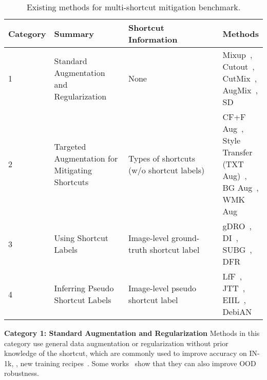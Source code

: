 \documentclass[10pt,twocolumn,letterpaper]{article}
\begin{document}
\begin{table}[b]
\vspace{-4mm}
\centering
\begin{adjustbox}{width=\linewidth}
\begin{tabular}{@{}p{0.15\linewidth}|p{0.3\linewidth}|p{0.4\linewidth}|p{0.475\linewidth}@{}}
\toprule
\textbf{Category} & \textbf{Summary}                                & \textbf{Shortcut Information} & \textbf{Methods}                                                   \\ \midrule
1        & Standard Augmentation and Regularization & None                    & Mixup~\cite{zhang2018Int.Conf.Learn.Represent.mixup}, Cutout~\cite{devries2017Improved,zhong2020AAAIConf.Artif.Intell.Random}, CutMix~\cite{yun2019IEEECVFInt.Conf.Comput.Vis.ICCVCutMix}, AugMix~\cite{hendrycks2020Int.Conf.Learn.Represent.AugMixa}, SD~\cite{pezeshki2021Adv.NeuralInf.Process.Syst.Gradient}                         \\ \midrule
2        & Targeted Augmentation for Mitigating Shortcuts         & Types of shortcuts (w/o shortcut labels)        & CF+F Aug~\cite{chang2021IEEECVFConf.Comput.Vis.PatternRecognit.CVPRRobust}, Style Transfer (TXT Aug)~\cite{geirhos2019Int.Conf.Learn.Represent.ImageNettrained}, BG Aug~\cite{xiao2021Int.Conf.Learn.Represent.Noise,ryali2021Characterizing}, WMK Aug \\ \midrule
3        & Using Shortcut Labels                   & Image-level ground-truth shortcut label      & gDRO~\cite{sagawa2020Int.Conf.Learn.Represent.Distributionally}, DI~\cite{wang2020IEEECVFConf.Comput.Vis.PatternRecognit.CVPRFairness}, SUBG~\cite{idrissi2022Conf.CausalLearn.Reason.Simple}, DFR~\cite{kirichenko2022Last}                                       \\ \midrule
4        & Inferring Pseudo Shortcut Labels        & Image-level pseudo shortcut label           & LfF~\cite{nam2020Adv.NeuralInf.Process.Syst.Learning}, JTT~\cite{liu2021Int.Conf.Mach.Learn.Just}, EIIL~\cite{creager2021Int.Conf.Mach.Learn.Environment}, DebiAN~\cite{li2022Eur.Conf.Comput.Vis.ECCVDiscovera}                                    \\ \bottomrule
\end{tabular}
\end{adjustbox}
\caption{Existing methods for multi-shortcut mitigation benchmark.}
\label{tab:benchmark_methods_summary}
\end{table}

\noindent \textbf{Category 1: Standard Augmentation and Regularization} \quad Methods in this category use general data augmentation or regularization without prior knowledge of the shortcut, which are commonly used to improve accuracy on IN-1k, \eg, new training recipes~\cite{vryniotis2021PyTorchBlogHow,wightman2021ResNet}.
Some works~\cite{chang2021IEEECVFConf.Comput.Vis.PatternRecognit.CVPRRobust,pinto2022Adv.NeuralInf.Process.Syst.RegMixup} show that they can also improve OOD robustness.
\end{document}
